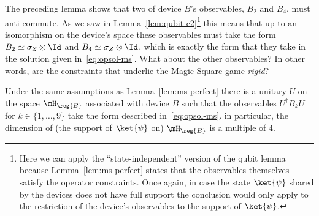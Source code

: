 The preceding lemma shows that two of device $B$'s observables, $B_2$ and $B_4$, must anti-commute. As we saw in Lemma~\ref{lem:qubit-c2}\footnote{Here we can apply the ``state-independent'' version of the qubit lemma because Lemma~\ref{lem:ms-perfect} states that the observables themselves satisfy the operator constraints. Once again, in case the state $\ket{\psi}$ shared by the devices does not have full support the conclusion would only apply to the restriction of the device's observables to the support of $\ket{\psi}$.} this means that up to an isomorphism on the device's space these observables must take the form $B_2 \simeq \sigma_Z \otimes \Id$ and $B_4 \simeq \sigma_Z \otimes \Id$, which is exactly the form that they take in the solution given in~\eqref{eq:opsol-ms}. What about the other observables? In other words, are the constraints that underlie the Magic Square game \emph{rigid}? 

\begin{lemma}\label{lem:ms-perfect-rigid}
Under the same assumptions as Lemma~\ref{lem:ms-perfect} there is a unitary $U$ on the space $\mH_\reg{B}$ associated with device $B$ such that the observables $U^\dagger B_k U$ for $k\in\{1,\ldots,9\}$ take the form described in~\eqref{eq:opsol-ms}. in particular, the dimension of (the support of $\ket{\psi}$ on) $\mH_\reg{B}$ is a multiple of $4$. 
\end{lemma}

